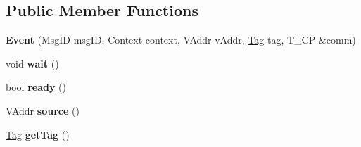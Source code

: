 \subsection*{Public Member Functions}
\begin{DoxyCompactItemize}
\item 
\hypertarget{classgraybat_1_1communicationPolicy_1_1zmq_1_1Event_a68e55ef0b3ba442d201beb0eb5841f65}{}{\bfseries Event} (Msg\+I\+D msg\+I\+D, Context context, V\+Addr v\+Addr, \hyperlink{structTag}{Tag} tag, T\+\_\+\+C\+P \&comm)\label{classgraybat_1_1communicationPolicy_1_1zmq_1_1Event_a68e55ef0b3ba442d201beb0eb5841f65}

\item 
\hypertarget{classgraybat_1_1communicationPolicy_1_1zmq_1_1Event_a083375e5e2dd4d6cd200b21e612feb9c}{}void {\bfseries wait} ()\label{classgraybat_1_1communicationPolicy_1_1zmq_1_1Event_a083375e5e2dd4d6cd200b21e612feb9c}

\item 
\hypertarget{classgraybat_1_1communicationPolicy_1_1zmq_1_1Event_a7c0c7257ac081d5ca6573ca4000df052}{}bool {\bfseries ready} ()\label{classgraybat_1_1communicationPolicy_1_1zmq_1_1Event_a7c0c7257ac081d5ca6573ca4000df052}

\item 
\hypertarget{classgraybat_1_1communicationPolicy_1_1zmq_1_1Event_a557def3edeff3a7626903d843587ac38}{}V\+Addr {\bfseries source} ()\label{classgraybat_1_1communicationPolicy_1_1zmq_1_1Event_a557def3edeff3a7626903d843587ac38}

\item 
\hypertarget{classgraybat_1_1communicationPolicy_1_1zmq_1_1Event_abd0aef53191c196467a01e388788cc49}{}\hyperlink{structTag}{Tag} {\bfseries get\+Tag} ()\label{classgraybat_1_1communicationPolicy_1_1zmq_1_1Event_abd0aef53191c196467a01e388788cc49}

\end{DoxyCompactItemize}
